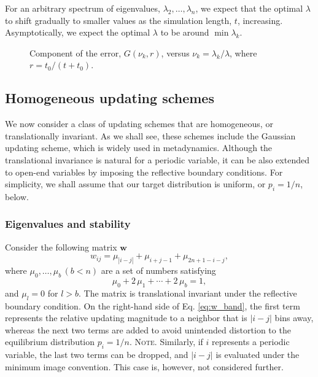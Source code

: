 \documentclass[reprint, floatfix]{revtex4-1}
\newcommand{\note}[1]{{\color{DarkGreen}\footnotesize \textsc{Note.} #1}}
\begin{document}
For an arbitrary spectrum of eigenvalues,
$\lambda_2, \dots, \lambda_n$,
we expect that the optimal $\lambda$ to shift gradually to
smaller values as the simulation length, $t$, increasing.
%
Asymptotically, we expect the optimal $\lambda$
to be around $\min \lambda_k$.



\begin{figure}[h]
\begin{center}
  \caption{
    \label{fig:err_component}
    Component of the error, $G(\nu_k, r)$,
    versus $\nu_k = \lambda_k / \lambda$,
    where $r = t_0 / (t + t_0)$.
  }
\end{center}
\end{figure}



\subsection{\label{sec:band-matrix}
Homogeneous updating schemes}



We now consider a class of updating schemes
that are homogeneous,
or translationally invariant. %
%
As we shall see,
these schemes include the Gaussian updating scheme,
which is widely used in metadynamics.
%
Although the translational invariance is
natural for a periodic variable\cite{dama2014},
it can be also extended to open-end variables
by imposing the reflective boundary conditions.
%
For simplicity, we shall assume that our target
distribution is uniform, or $p_i = 1/n$, below.



\subsubsection{
Eigenvalues and stability}


Consider the following matrix $\mathbf w$
%
\begin{equation}
  w_{ij}
  =
  \mu_{ |i - j| }
  + \mu_{ i + j - 1 }
  + \mu_{ 2 n + 1 - i - j },
  \label{eq:w_band}
\end{equation}
%
where $\mu_0, \dots, \mu_b \, (b < n)$
are a set of numbers satisfying
%
\begin{equation}
\mu_0 + 2 \, \mu_1 + \cdots + 2 \, \mu_b = 1,
\label{eq:m_normalization}
\end{equation}
%
and $\mu_l = 0$ for $l > b$.
%
The matrix is translational invariant under the reflective
boundary condition\cite{bussi2006}.
%
On the right-hand side of Eq. \eqref{eq:w_band},
the first term represents the relative updating magnitude
to a neighbor that is $|i - j|$ bins away,
whereas the next two terms are added
to avoid unintended distortion\cite{dickson2011, mcgovern2013}
to the equilibrium distribution $p_i = 1/n$\cite{bussi2006}.
%
\note{Similarly, if $i$ represents a periodic variable,
the last two terms can be dropped, and
$|i-j|$ is evaluated
under the minimum image convention\cite{dama2014}.
This case is, however, not considered further.}
\end{document}
